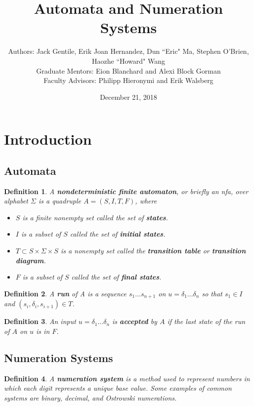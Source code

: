 \documentclass[a4paper]{article}
\title{Automata and Numeration Systems}
\author{
Authors: Jack Gentile, Erik Joan Hernandez, Dun ``Eric" Ma, Stephen O'Brien, \\Haozhe ``Howard" Wang\\
Graduate Mentors: Eion Blanchard and Alexi Block Gorman\\
Faculty Advisors: Philipp Hieronymi and
Erik Walsberg\\
}
\date{December 21, 2018}
\newtheorem{definition}{Definition}
\begin{document}
\maketitle

\section{Introduction}

\subsection{Automata}

	\begin{definition}A \textbf{nondeterministic finite automaton}, or briefly an nfa, over alphabet $\Sigma$ is a quadruple $A = (S, I, T, F)$, where
	\begin{itemize}
		\item $S$ is a finite nonempty set called the set of \textbf{states}.\\
		\item $I$ is a subset of $S$ called the set of \textbf{initial states}.\\
		\item $T \subset S \times \Sigma \times S$ is a nonempty set called the \textbf{transition table} or \textbf{transition diagram}.\\
		\item $F$ is a subset of $S$ called the set of \textbf{final states}.
	\end{itemize}
\end{definition}

\begin{definition}
A \textbf{run} of A is a sequence $s_1...s_{n+1}$ on $u=\delta_1 ... \delta_n$ so that $s_1 \in I$ and $(s_i, \delta_i, s_{i+1}) \in T$.
\end{definition}

\begin{definition}
An input $u = \delta_1 ... \delta_n$ is \textbf{accepted} by $A$ if the last state of the run of $A$ on $u$ is in $F$.\\
\end{definition}


\subsection{Numeration Systems}

\begin{definition}A \textbf{numeration system} is a method used to represent numbers in which each digit represents a unique base value. Some examples of common systems are binary, decimal, and Ostrowski numerations.
\end{definition}
\end{document}
